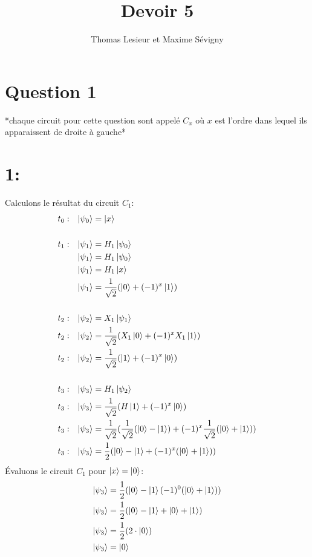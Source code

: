 \documentclass{article}
\title{Devoir 5}
\author{Thomas Lesieur et Maxime Sévigny}
\date{}
\begin{document}
\maketitle
\newpage
\section*{Question 1}
*chaque circuit pour cette question sont appelé $C_x$ où $x$ est l'ordre dans lequel ils apparaissent de droite à gauche*

\section*{1:}
Calculons le résultat du circuit $C_1$:
\begin{align*}
&t_0:&  \ket{\psi_0} &= \ket{x} \\ \\
&t_1:&  \ket{\psi_1} &= H_1\ket{\psi_0} \\
&&      \ket{\psi_1} &= H_1\ket{\psi_0} \\
&&      \ket{\psi_1} &= H_1\ket{x} \\
&&      \ket{\psi_1} &= \frac{1}{\sqrt{2}}(\ket{0} + (-1)^x\ket{1}) \\ \\
&t_2:&  \ket{\psi_2} &= X_1\ket{\psi_1} \\
&t_2:&  \ket{\psi_2} &= \frac{1}{\sqrt{2}}(X_1\ket{0} + (-1)^xX_1\ket{1}) \\
&t_2:&  \ket{\psi_2} &= \frac{1}{\sqrt{2}}(\ket{1} + (-1)^x\ket{0}) \\ \\
&t_3:&  \ket{\psi_3} &= H_1\ket{\psi_2} \\
&t_3:&  \ket{\psi_3} &= \frac{1}{\sqrt{2}}(H\ket{1} + (-1)^x\ket{0}) \\
&t_3:&  \ket{\psi_3} &= \frac{1}{\sqrt{2}}(\frac{1}{\sqrt{2}}(\ket{0} - \ket{1}) + (-1)^x\frac{1}{\sqrt{2}}(\ket{0} + \ket{1})) \\
&t_3:&  \ket{\psi_3} &= \frac{1}{2}(\ket{0} - \ket{1} + (-1)^x(\ket{0} + \ket{1})) \\
\end{align*}
\newpage
Évaluons le circuit $C_1$ pour $\ket{x} = \ket{0}$:
\begin{align*}
\ket{\psi_3} &= \frac{1}{2}(\ket{0} - \ket{1} (-1)^0(\ket{0} + \ket{1})) \\
\ket{\psi_3} &= \frac{1}{2}(\ket{0} - \ket{1} + \ket{0} + \ket{1}) \\
\ket{\psi_3} &= \frac{1}{2}(2 \cdot \ket{0}) \\
\ket{\psi_3} &= \ket{0}
\end{align*}
\end{document}
